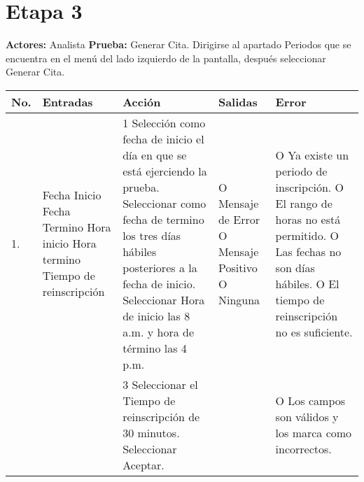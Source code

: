 \section*{Etapa 3}
\textbf{Actores:} Analista\newline
\textbf{Prueba:} Generar Cita.\newline
Dirigirse al apartado Periodos que se encuentra en el menú del lado izquierdo de la pantalla, después seleccionar Generar Cita.
\begin{longtable}{|p{0.7cm}|p{3cm}|p{6cm}|p{2.3cm}|p{3cm}|}
    \hline	
	\textbf{No.}
	&
	\textbf{Entradas}	
	&
	\textbf{Acción}
	&
	\textbf{Salidas}
	&
	\textbf{Error}
	\\
    \hline
	1.
	&
	Fecha Inicio\newline
	Fecha Termino\newline
	Hora inicio\newline
	Hora termino\newline
	Tiempo de  reinscripción	
	&
	1 Selección como fecha de inicio el día en que se está ejerciendo la prueba.\newline
	2 Seleccionar como fecha de termino los tres días hábiles posteriores a la fecha de inicio.\newline
	3 Seleccionar Hora de inicio  las 8 a.m. y hora de término las 4 p.m.	 	
	&
	O Mensaje de Error\newline
 	O Mensaje Positivo\newline
 	O Ninguna	 	 
	&
 	O Ya existe un periodo de inscripción.\newline
 	O El rango de horas no está permitido.\newline
 	O Las fechas no son días hábiles.\newline
 	O El tiempo de reinscripción no es suficiente.\\
 	\hline
 	  & &
 	3 Seleccionar el Tiempo de reinscripción de 30 minutos.\newline
	4 Seleccionar Aceptar.
	& &
 	O Los campos son válidos y los marca como incorrectos.\\
 	\hline
\end{longtable}

